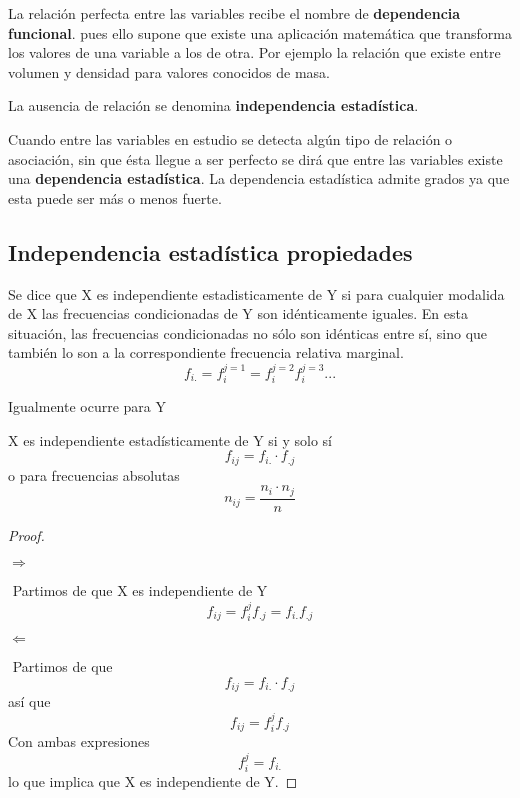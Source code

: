 \documentclass{article}
\begin{document}
 La relación perfecta entre las variables recibe el nombre de \textbf{dependencia funcional}. pues ello supone que existe una aplicación matemática que transforma los valores de una variable a los de otra. Por ejemplo la relación que existe entre volumen y densidad para valores conocidos de masa.
 
 La ausencia de relación se denomina \textbf{independencia estadística}.
 
 Cuando entre las variables en estudio se detecta algún tipo de relación o asociación, sin que ésta llegue a ser perfecto se dirá que entre las variables existe una \textbf{dependencia estadística}. La dependencia estadística admite grados ya que esta puede ser más o menos fuerte.
 
 \subsection{ Independencia estadística propiedades }
 Se dice que X es independiente estadisticamente de Y si para cualquier modalida de X las frecuencias condicionadas de Y son idénticamente iguales. En esta situación, las frecuencias condicionadas no sólo son idénticas entre sí, sino que también lo son a la correspondiente frecuencia relativa marginal.  
 $$ f_{i.} = f_i^{j=1} = f_i^{j=2} f_i^{j=3} ... $$
 
 Igualmente ocurre para Y
 
 \vspace{0.5cm}
  
\begin{theorem}

X es independiente estadísticamente de Y si y solo sí $$ f_{ij} = f_{i.} \cdot f_{.j} $$ o para frecuencias absolutas $$n_{ij} = \frac{n_i \cdot n_j}{n}$$
\end{theorem}

\begin{proof}
$ $\newline

$\boxed{\Rightarrow}$ 

$ $\newline
Partimos de que X es independiente de Y 
 $$f_{ij} = f_i^j f_{.j} = f_{i.} f_{.j}$$
 
$\boxed{\Leftarrow}$

$ $\newline
 Partimos de que $$ f_{ij} = f_{i.} \cdot f_{.j} $$ así que $$ f_{ij} = f_i^j f_{.j} $$ Con ambas expresiones $$f_i^j = f_{i.} $$ lo que implica que X es independiente de Y.
\end{proof}
\end{document}
